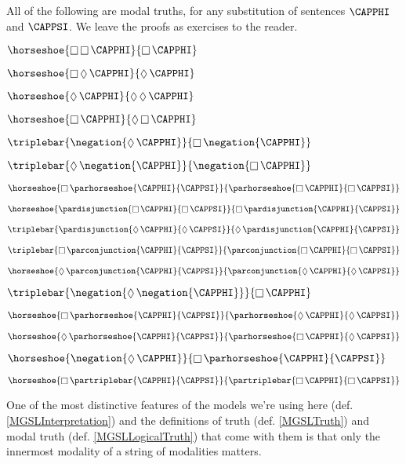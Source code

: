 \begin{majorILnc}{}
All of the following are modal truths, for any substitution of sentences $\CAPPHI$ and $\CAPPSI$. 
We leave the proofs as exercises to the reader.
\begin{multicols}{2}
\begin{cenumerate}
\item $\horseshoe{\BOX\BOX\CAPPHI}{\BOX\CAPPHI}$
\item $\horseshoe{\BOX\DIAMOND\CAPPHI}{\DIAMOND\CAPPHI}$
\item $\horseshoe{\DIAMOND\CAPPHI}{\DIAMOND\DIAMOND\CAPPHI}$
\item $\horseshoe{\BOX\CAPPHI}{\DIAMOND\BOX\CAPPHI}$
\item $\triplebar{\negation{\DIAMOND\CAPPHI}}{\BOX\negation{\CAPPHI}}$
\item $\triplebar{\DIAMOND\negation{\CAPPHI}}{\negation{\BOX\CAPPHI}}$
\item $\horseshoe{\BOX\parhorseshoe{\CAPPHI}{\CAPPSI}}{\parhorseshoe{\BOX\CAPPHI}{\BOX\CAPPSI}}$
\item $\horseshoe{\pardisjunction{\BOX\CAPPHI}{\BOX\CAPPSI}}{\BOX\pardisjunction{\CAPPHI}{\CAPPSI}}$
\item $\triplebar{\pardisjunction{\DIAMOND\CAPPHI}{\DIAMOND\CAPPSI}}{\DIAMOND\pardisjunction{\CAPPHI}{\CAPPSI}}$
\item $\triplebar{\BOX\parconjunction{\CAPPHI}{\CAPPSI}}{\parconjunction{\BOX\CAPPHI}{\BOX\CAPPSI}}$
\item $\horseshoe{\DIAMOND\parconjunction{\CAPPHI}{\CAPPSI}}{\parconjunction{\DIAMOND\CAPPHI}{\DIAMOND\CAPPSI}}$
\item $\triplebar{\negation{\DIAMOND\negation{\CAPPHI}}}{\BOX\CAPPHI}$
\item $\horseshoe{\BOX\parhorseshoe{\CAPPHI}{\CAPPSI}}{\parhorseshoe{\DIAMOND\CAPPHI}{\DIAMOND\CAPPSI}}$
\item $\horseshoe{\DIAMOND\parhorseshoe{\CAPPHI}{\CAPPSI}}{\parhorseshoe{\BOX\CAPPHI}{\DIAMOND\CAPPSI}}$
\item $\horseshoe{\negation{\DIAMOND\CAPPHI}}{\BOX\parhorseshoe{\CAPPHI}{\CAPPSI}}$
\item $\horseshoe{\BOX\partriplebar{\CAPPHI}{\CAPPSI}}{\partriplebar{\BOX\CAPPHI}{\BOX\CAPPSI}}$
\end{cenumerate}
\end{multicols}
\end{majorILnc}
One of the most distinctive features of the models we're using here (def. \ref{MGSLInterpretation}) and the definitions of truth (def. \ref{MGSLTruth}) and modal truth (def. \ref{MGSLLogicalTruth}) that come with them is that only the innermost modality of a string of modalities matters. 
